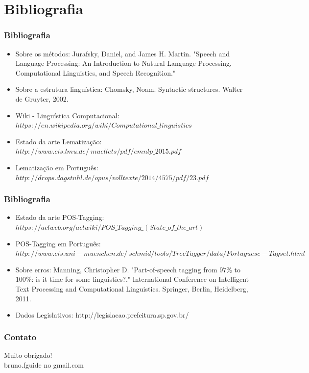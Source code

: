 \documentclass[11pt]{beamer}
\begin{document}
\section{Bibliografia}
\begin{frame}
\frametitle{Bibliografia}
\begin{itemize}
	\item Sobre os métodos: Jurafsky, Daniel, and James H. Martin. "Speech and Language Processing: An Introduction to Natural Language Processing, Computational Linguistics, and Speech Recognition."\\
	\item Sobre a estrutura linguística: Chomsky, Noam. Syntactic structures. Walter de Gruyter, 2002.\\
	\item Wiki - Linguística Computacional: $https://en.wikipedia.org/wiki/Computational\_linguistics$
	\item Estado da arte Lematização: $http://www.cis.lmu.de/~muellets/pdf/emnlp\_2015.pdf$\\
	\item Lematização em Português: $http://drops.dagstuhl.de/opus/volltexte/2014/4575/pdf/23.pdf$\\
\end{itemize}
\end{frame}
\begin{frame}
\frametitle{Bibliografia}
\begin{itemize}
	\item Estado da arte POS-Tagging: $https://aclweb.org/aclwiki/POS\_Tagging\_(State\_of\_the\_art)$\\
	\item POS-Tagging em Português: $http://www.cis.uni-muenchen.de/~schmid/tools/TreeTagger/data/Portuguese-Tagset.html$
	\item Sobre erros: Manning, Christopher D. "Part-of-speech tagging from 97\% to 100\%: is it time for some linguistics?." International Conference on Intelligent Text Processing and Computational Linguistics. Springer, Berlin, Heidelberg, 2011.\\
	\item Dados Legislativos: http://legislacao.prefeitura.sp.gov.br/\\
\end{itemize}
\end{frame}
\begin{frame}
\frametitle{Contato}
\begin{center}
	Muito obrigado!\\
	bruno.fguide no gmail.com
\end{center}
\end{frame}
\end{document}
